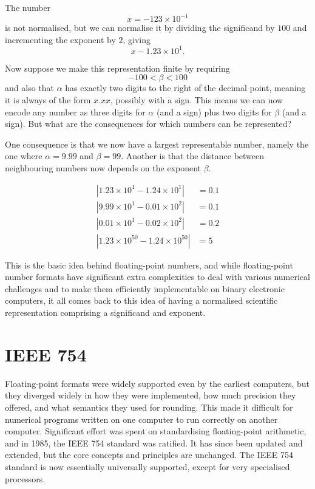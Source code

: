 \begin{example}
  The number
  \[
    x = -123 \times 10^{-1}
  \]
  is not normalised, but we can normalise it by dividing the significand
  by $100$ and incrementing the exponent by $2$, giving
  \[
    x -1.23 \times 10^{1}.
  \]
\end{example}

Now suppose we make this representation finite by requiring
\[
  -100 < \beta < 100
\]
and also that $\alpha$ has exactly two digits to the right of the
decimal point, meaning it is always of the form $x.xx$, possibly with
a sign.  This means we can now encode any number as three digits for
$\alpha$ (and a sign) plus two digits for $\beta$ (and a sign).  But
what are the consequences for which numbers can be represented?

One consequence is that we now have a largest representable number,
namely the one where $\alpha=9.99$ and $\beta=99$.  Another is that
the distance between neighbouring numbers now depends on the exponent
$\beta$.
\begin{example}
\begin{align}
  |1.23\times 10^{1} - 1.24\times 10^{1}| &= 0.1 \\
  |9.99\times 10^{1} - 0.01\times 10^{2}| &= 0.1 \\
  |0.01\times 10^{1} - 0.02\times 10^{2}| &= 0.2 \\
  |1.23\times 10^{50} - 1.24\times 10^{50}| &= 5
\end{align}
\end{example}

This is the basic idea behind floating-point numbers, and while
floating-point number formats have significant extra complexities to
deal with various numerical challenges and to make them efficiently
implementable on binary electronic computers, it all comes back to
this idea of having a normalised scientific representation comprising
a significand and exponent.

\section{IEEE 754}

Floating-point formats were widely supported even by the earliest
computers, but they diverged widely in how they were implemented, how
much precision they offered, and what semantics they used for
rounding.  This made it difficult for numerical programs written on
one computer to run correctly on another computer.  Significant effort
was spent on standardising floating-point arithmetic, and in 1985, the
IEEE 754 standard was ratified.  It has since been updated and
extended, but the core concepts and principles are unchanged.  The
IEEE 754 standard is now essentially universally supported, except for
very specialised processors.

